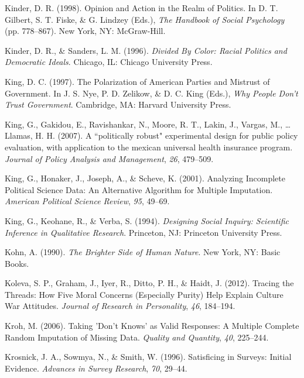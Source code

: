 \documentclass[12pt,econ]{sources/authesis}
\begin{document}
\leavevmode\hypertarget{ref-kinder_1998_opinion}{}%
Kinder, D. R. (1998). Opinion and Action in the Realm of Politics. In D. T. Gilbert, S. T. Fiske, \& G. Lindzey (Eds.), \emph{The Handbook of Social Psychology} (pp. 778--867). New York, NY: McGraw-Hill.

\leavevmode\hypertarget{ref-kinder_1996_divided}{}%
Kinder, D. R., \& Sanders, L. M. (1996). \emph{Divided By Color: Racial Politics and Democratic Ideals}. Chicago, IL: Chicago University Press.

\leavevmode\hypertarget{ref-king_polarization_1997}{}%
King, D. C. (1997). The Polarization of American Parties and Mistrust of Government. In J. S. Nye, P. D. Zelikow, \& D. C. King (Eds.), \emph{Why People Don't Trust Government}. Cambridge, MA: Harvard University Press.

\leavevmode\hypertarget{ref-king_a-politically_2007}{}%
King, G., Gakidou, E., Ravishankar, N., Moore, R. T., Lakin, J., Vargas, M., \ldots{} Llamas, H. H. (2007). A ``politically robust" experimental design for public policy evaluation, with application to the mexican universal health insurance program. \emph{Journal of Policy Analysis and Management}, \emph{26}, 479--509.

\leavevmode\hypertarget{ref-king_2001_analyzing}{}%
King, G., Honaker, J., Joseph, A., \& Scheve, K. (2001). Analyzing Incomplete Political Science Data: An Alternative Algorithm for Multiple Imputation. \emph{American Political Science Review}, \emph{95}, 49--69.

\leavevmode\hypertarget{ref-king_designing_1994}{}%
King, G., Keohane, R., \& Verba, S. (1994). \emph{Designing Social Inquiry: Scientific Inference in Qualitative Research}. Princeton, NJ: Princeton University Press.

\leavevmode\hypertarget{ref-kohn_brighter_1990}{}%
Kohn, A. (1990). \emph{The Brighter Side of Human Nature}. New York, NY: Basic Books.

\leavevmode\hypertarget{ref-koleva_2012_tracing}{}%
Koleva, S. P., Graham, J., Iyer, R., Ditto, P. H., \& Haidt, J. (2012). Tracing the Threads: How Five Moral Concerns (Especially Purity) Help Explain Culture War Attitudes. \emph{Journal of Research in Personality}, \emph{46}, 184--194.

\leavevmode\hypertarget{ref-kroh_2006_taking}{}%
Kroh, M. (2006). Taking 'Don't Knows' as Valid Responses: A Multiple Complete Random Imputation of Missing Data. \emph{Quality and Quantity}, \emph{40}, 225--244.

\leavevmode\hypertarget{ref-krosnick_1996_satisficing}{}%
Krosnick, J. A., Sowmya, N., \& Smith, W. (1996). Satisficing in Surveys: Initial Evidence. \emph{Advances in Survey Research}, \emph{70}, 29--44.
\end{document}
